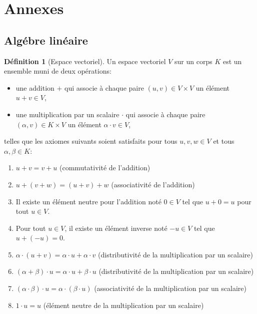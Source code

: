 \documentclass[11pt,a4paper]{article}
\numberwithin{equation}{section}
\theoremstyle{plain}
\theoremstyle{definition}
\newtheorem{definition}[theorem]{Définition}
\theoremstyle{remark}
\begin{document}
\section{Annexes}

\subsection{Algébre linéaire}

\begin{definition}[Espace vectoriel]
    Un espace vectoriel \(V\) sur un corps \(K\) est un ensemble muni de deux opérations:
    \begin{itemize}
        \item une addition \(+\) qui associe à chaque paire \((u, v) \in V \times V\) un élément \(u + v \in V\),
        \item une multiplication par un scalaire \(\cdot\) qui associe à chaque paire \((\alpha, v) \in K \times V\) un élément \(\alpha \cdot v \in V\),
    \end{itemize}
    telles que les axiomes suivants soient satisfaits pour tous \(u, v, w \in V\) et tous \(\alpha, \beta \in K\):
    \begin{enumerate}
        \item \(u + v = v + u\) (commutativité de l'addition)
        \item \(u + (v + w) = (u + v) + w\) (associativité de l'addition)
        \item Il existe un élément neutre pour l'addition noté \(0 \in V\) tel que \(u + 0 = u\) pour tout \(u \in V\).
        \item Pour tout \(u \in V\), il existe un élément inverse noté \(-u \in V\) tel que \(u + (-u) = 0\).
        \item \(\alpha \cdot (u + v) = \alpha \cdot u + \alpha \cdot v\) (distributivité de la multiplication par un scalaire)
        \item \((\alpha + \beta) \cdot u = \alpha \cdot u + \beta \cdot u\) (distributivité de la multiplication par un scalaire)
        \item \((\alpha \cdot \beta) \cdot u = \alpha \cdot (\beta \cdot u)\) (associativité de la multiplication par un scalaire)
        \item \(1 \cdot u = u\) (élément neutre de la multiplication par un scalaire)
    \end{enumerate}
\end{definition}
\end{document}
